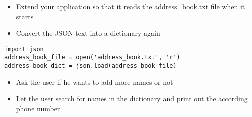\documentclass[10pt, a4paper]{beamer} %
\begin{document}
{\begin{frame}
	\framebreak

	\begin{itemize}
		\item Extend your application so that it reads the address\_book.txt file when it starts
		\item Convert the JSON text into a dictionary again
	\end{itemize}

	{
	\mdseries
	\begin{lstlisting}
import json
address_book_file = open('address_book.txt', 'r')
address_book_dict = json.load(address_book_file)
\end{lstlisting}
	}

	\begin{itemize}
		\item Ask the user if he wants to add more names or not
		\item Let the user search for names in the dictionary and print out the according phone number
	\end{itemize}

\end{frame}
}
\end{document}
